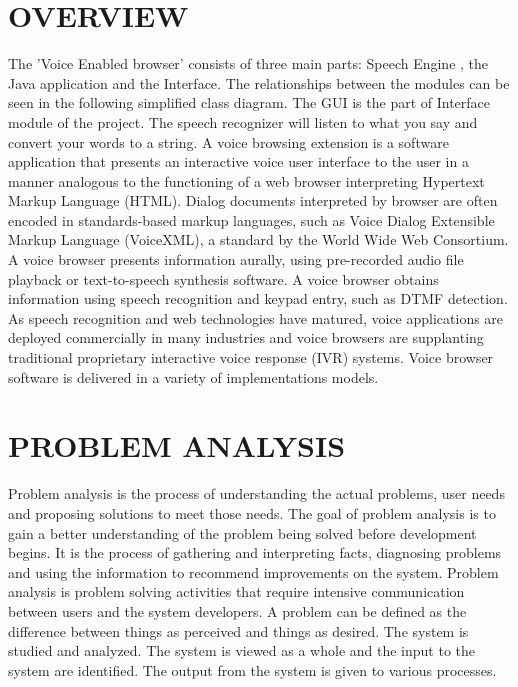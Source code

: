 \documentclass[11pt]{report} %
\begin{document}
\section{OVERVIEW}
\label{sec:OVERVIEW}
The 'Voice Enabled browser' consists of three main parts: Speech Engine , the Java application and the Interface. The relationships between the modules can be seen in the following simplified class diagram. The GUI is the part of Interface module of the project.  The speech recognizer will listen to what you say and convert your words to a string. A voice browsing extension is a software application that presents an interactive voice user interface to the user in a manner analogous to the functioning of a web browser interpreting Hypertext Markup Language (HTML). Dialog documents interpreted by browser are often encoded in standards-based markup languages, such as Voice Dialog Extensible Markup Language (VoiceXML), a standard by the World Wide Web Consortium. A voice browser presents information aurally, using pre-recorded audio file playback or text-to-speech synthesis software. A voice browser obtains information using speech recognition \cite{Ornbospeech,Walshspeech,speechStackoverflow} and keypad entry, such as DTMF detection. As speech recognition and web technologies have matured, voice applications are deployed commercially in many industries and voice browsers are supplanting traditional proprietary interactive voice response (IVR) systems. Voice browser software is delivered in a variety of implementations models.


\section{PROBLEM ANALYSIS}
\label{sec:PROBLEM ANALYSIS}

Problem analysis is the process of understanding the actual problems, user needs and proposing solutions to meet those needs. The goal of problem analysis is to gain a better understanding of the problem being solved before development begins. It is the process of gathering and interpreting facts, diagnosing problems and using the information to recommend improvements on the system. Problem analysis is problem solving activities that require intensive communication between users and the system developers. A problem can be defined as the difference between things as perceived and things as desired. The system is studied and analyzed. The system is viewed as a whole and the input to the system are identified. The output from the system is given to various processes.
\end{document}
